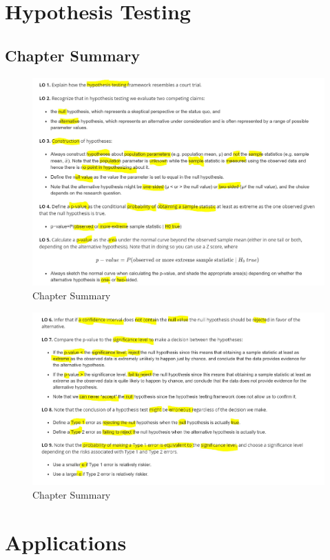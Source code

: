 \documentclass[]{book}
\begin{document}
\chapter{Hypothesis Testing}\label{test}

\section{Chapter Summary}\label{chapter-summary}

\begin{figure}

{\centering \includegraphics[width=0.8\linewidth]{graphs/3-1} 

}

\caption{Chapter Summary}\label{fig:chap3-summary-fig1}
\end{figure}\begin{figure}

{\centering \includegraphics[width=0.8\linewidth]{graphs/3-2} 

}

\caption{Chapter Summary}\label{fig:chap3-summary-fig2}
\end{figure}

\chapter{Applications}\label{applications}
\end{document}
